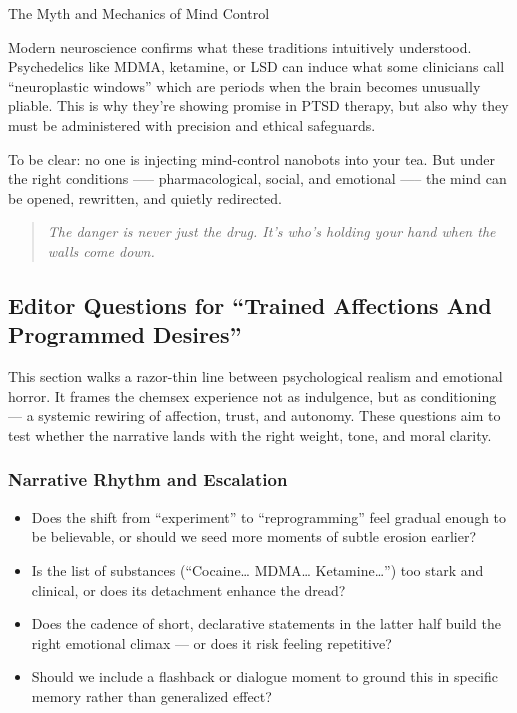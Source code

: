 \begin{PsychologicalSidebar}{The Myth and Mechanics of Mind Control}
  \medskip
  
  Modern neuroscience confirms what these traditions intuitively understood. Psychedelics like MDMA, ketamine, or LSD 
  can induce what some clinicians call “neuroplastic windows” which are periods when the brain becomes unusually 
  pliable. This is why they’re showing promise in PTSD therapy, but also why they must be administered with 
  precision and ethical safeguards. 

  \medskip
  
  To be clear: no one is injecting mind-control nanobots into your tea. But under the right conditions 
  —-- pharmacological, social, and emotional —-- the mind can be opened, rewritten, and quietly 
  redirected.
  
  \begin{quote}
  \textit{The danger is never just the drug. It’s who’s holding your hand when the walls come down.}
  \end{quote}
  
\end{PsychologicalSidebar}

\medskip


\subsection*{Editor Questions for ``Trained Affections And Programmed Desires''}

This section walks a razor-thin line between psychological realism and emotional horror. It frames the chemsex experience not as indulgence, but as conditioning — a systemic rewiring of affection, trust, and autonomy. These questions aim to test whether the narrative lands with the right weight, tone, and moral clarity.

\subsubsection*{Narrative Rhythm and Escalation}

\begin{itemize}
  \item Does the shift from “experiment” to “reprogramming” feel gradual enough to be believable, or should we seed more moments of subtle erosion earlier?
  \item Is the list of substances (``Cocaine… MDMA… Ketamine…'') too stark and clinical, or does its detachment enhance the dread?
  \item Does the cadence of short, declarative statements in the latter half build the right emotional climax — or does it risk feeling repetitive?
  \item Should we include a flashback or dialogue moment to ground this in specific memory rather than generalized effect?
\end{itemize}

